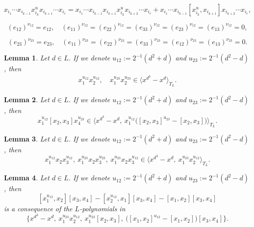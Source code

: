 \documentclass[10pt,a4paper]{amsart}
\newtheorem{lemma}{Lemma}
\begin{document}
\begin{equation}
x_{i_1}\cdots x_{i_{k-1}}x_{i_k}^{u}x_{i_{k+1}}\cdots x_{i_r} = x_{i_1}\cdots x_{i_{k-1}}x_{i_{k+1}}x_{i_k}^{u}x_{i_{k+2}}\cdots x_{i_r} + x_{i_1}\cdots x_{i_{k-1}}[x_{i_k}^{u},x_{i_{k+1}}]x_{i_{k+2}}\cdots x_{i_r},
\end{equation}

\begin{equation}\label{eq: nu_12}
    (e_{12})^{\nu_{12}}=e_{12}, \quad (e_{11})^{\nu_{12}} = (e_{22})^{\nu_{12}} = (e_{33})^{\nu_{12}}= (e_{23})^{\nu_{12}}=(e_{13})^{\nu_{12}} =0,
\end{equation}

\begin{equation}\label{eq: nu_23}
   (e_{23})^{\nu_{23}}=e_{23}, \quad  (e_{11})^{\nu_{23}} = (e_{22})^{\nu_{23}} = (e_{33})^{\nu_{23}}= (e_{12})^{\nu_{23}}=(e_{13})^{\nu_{23}} =0.
\end{equation}

\begin{lemma}\label{lem: cons IdUT3e1-e2 1}
    Let $d\in L$. If we denote $u_{12}:=2^{-1}(d^2+d)$ and $u_{23}:=2^{-1}(d^2-d)$, then 
    \begin{equation*}
        \begin{split}
          x_1^{u_{12}} x_2^{u_{12}}, \quad x_1^{u_{23}} x_2^{u_{23}} \in \langle x^{d^3}-x^{d}\rangle_{T_L}.
        \end{split}
    \end{equation*}
\end{lemma}

\begin{lemma}\label{lem: cons IdUT3e1-e2 4}
     Let $d\in L$. If we denote $u_{12}:=2^{-1}(d^2+d)$ and $u_{23}:=2^{-1}(d^2-d)$, then 
     $$ x_1^{u_{12}}[x_2,x_3]x_4^{u_{23}} \in \langle x^{d^3}-x^{d}, \ x_1^{u_{12}} \big([x_2,x_3]^{u_{23}}-[x_2,x_3]\big) \rangle_{T_L}.$$
\end{lemma}

\begin{lemma}\label{lem: cons IdUT3e1-e2 3}
    Let $d\in L$. If we denote $u_{12}:=2^{-1}(d^2+d)$ and $u_{23}:=2^{-1}(d^2-d)$, then
    $$ x_1^{u_{12}}x_2 x_3^{u_{12}}, \ x_1^{u_{23}} x_2 x_3^{u_{23}}, \ x_1^{u_{23}}x_2x_3^{u_{12}} \in \langle x^{d^3}-x^{d}, \ x_1^{u_{23}}x_2^{u_{12}}\rangle_{T_L}.$$
\end{lemma}

\begin{lemma}\label{lem: cons IdUT3e1-e2 5}
    Let $d\in L$. If we denote $u_{12}:=2^{-1}(d^2+d)$ and $u_{23}:=2^{-1}(d^2-d)$, then
     $$
 [x_1^{u_{12}},x_2] [x_3,x_4] - [x_2^{u_{12}},x_1] [x_3,x_4]-[x_1,x_2][x_3,x_4]
$$
is a consequence of the $L$-polynomials in $$\bigl\{x^{d^3}-x^{d}, \ x_1^{u_{23}}x_2^{u_{12}}, \ x_1^{u_{23}}[x_2,x_3],\ \big([x_1,x_2]^{u_{12}}-[x_1,x_2]\big)[x_3,x_4]\bigr\}.$$
\end{lemma}
\end{document}
